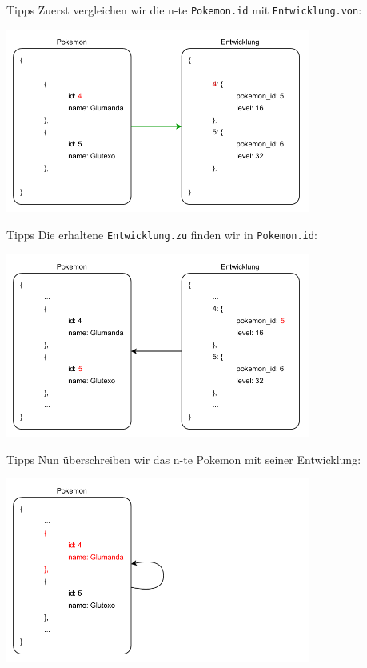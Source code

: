 \begin{frame}{Tipps}
    Zuerst vergleichen wir die n-te \texttt{Pokemon.id} mit \texttt{Entwicklung.von}:

    \begin{center}
        \includegraphics[width=0.75\textwidth]{pictures/example_2.pdf}
    \end{center}
\end{frame}

\begin{frame}{Tipps}
    Die erhaltene \texttt{Entwicklung.zu} finden wir in \texttt{Pokemon.id}:

    \begin{center}
        \includegraphics[width=0.75\textwidth]{pictures/example_3.pdf}
    \end{center}
\end{frame}

\begin{frame}{Tipps}
    Nun überschreiben wir das n-te Pokemon mit seiner Entwicklung:

    \begin{center}
        \includegraphics[width=0.75\textwidth]{pictures/example_4.pdf}
    \end{center}
\end{frame}

